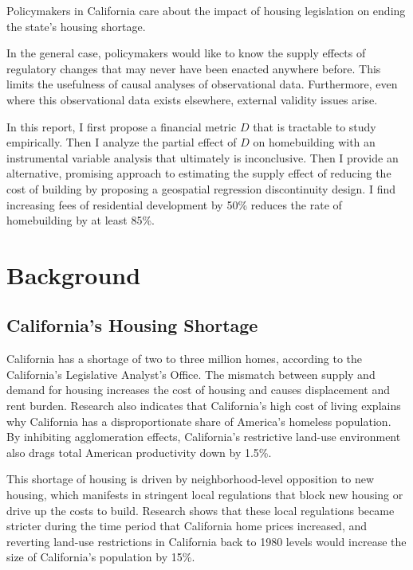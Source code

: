 \documentclass[a4paper,12pt]{article}
\begin{document}
Policymakers in California care about the impact of housing legislation on ending the state's housing shortage. 

In the general case, policymakers would like to know the supply effects of regulatory changes that may never have been enacted anywhere before. This limits the usefulness of causal analyses of observational data. Furthermore, even where this observational data exists elsewhere, external validity issues arise.

In this report, I first propose a financial metric $D$ that is tractable to study empirically. Then I analyze the partial effect of $D$ on homebuilding with an instrumental variable analysis that ultimately is inconclusive. Then I provide an alternative, promising approach to estimating the supply effect of reducing the cost of building by proposing a geospatial regression discontinuity design. I find increasing fees of residential development by 50\% reduces the rate of homebuilding by at least 85\%.

\section{Background}


\subsection{California's Housing Shortage}

\label{background}
California has a shortage of two to three million homes, according to the California's Legislative Analyst's Office.\cite{alamo2015california} The mismatch between supply and demand for housing increases the cost of housing and causes displacement and rent burden.\cite{pennington2021does} Research also indicates that California's high cost of living explains why California has a disproportionate share of America's homeless population.\cite{kushel2023towards} By inhibiting agglomeration effects, California's restrictive land-use environment also drags total American productivity down by 1.5\%.\cite{herkenhoff2018tarnishing}

This shortage of housing is driven by neighborhood-level opposition to new housing, which manifests in stringent local regulations that block new housing or drive up the costs to build.\cite{monkkonen2016understanding} Research shows that these local regulations became stricter during the time period that California home prices increased, and reverting land-use restrictions in California back to 1980 levels would increase the size of California's population by 15\%.\cite{herkenhoff2018tarnishing}
\end{document}
